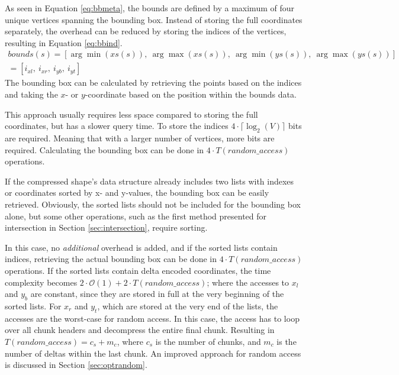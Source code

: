 As seen in Equation \ref{eq:bbmeta}, the bounds are defined by a maximum of four unique vertices spanning the bounding box. Instead of storing the full coordinates separately, the overhead can be reduced by storing the indices of the vertices, resulting in Equation \ref{eq:bbind}.
\begin{equation}
    \label{eq:bbind}
    \begin{gathered}
    bounds(s)=[\arg \min(xs(s)),\ \arg \max(xs(s)),\ \arg \min(ys(s)),\ \arg \max(ys(s))] \\
    = [i_{xl},\ i_{xr},\ i_{yb},\ i_{yt}]
    \end{gathered}
\end{equation}
The bounding box can be calculated by retrieving the points based on the indices and taking the $x$- or $y$-coordinate based on the position within the bounds data.

This approach usually requires less space compared to storing the full coordinates, but has a slower query time. To store the indices $4 \cdot \lceil \log_2(V) \rceil$ bits are required. Meaning that with a larger number of vertices, more bits are required. Calculating the bounding box can be done in 
$4 \cdot T(random\_access)$ operations.

If the compressed shape's data structure already includes two lists with indexes or coordinates sorted by x- and y-values, the bounding box can be easily retrieved. Obviously, the sorted lists should not be included for the bounding box alone, but some other operations, such as the first method presented for intersection in Section \ref{sec:intersection}, require sorting.

In this case, no \emph{additional} overhead is added, and if the sorted lists contain indices, retrieving the actual bounding box can be done in $4 \cdot T(random\_access)$ operations. If the sorted lists contain delta encoded coordinates, the time complexity becomes $2 \cdot \mathcal{O}(1) + 2 \cdot T(random\_access)$; where the accesses to $x_l$ and $y_b$ are constant, since they are stored in full at the very beginning of the sorted lists. For $x_r$ and $y_t$, which are stored at the very end of the lists, the accesses are the worst-case for random access. In this case, the access has to loop over all chunk headers and decompress the entire final chunk. Resulting in $T(random\_access) = c_s + m_c$, where $c_s$ is the number of chunks, and $m_c$ is the number of deltas within the last chunk. An improved approach for random access is discussed in Section \ref{sec:optrandom}. 

